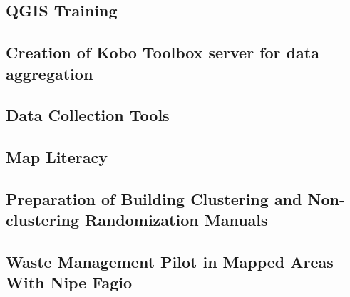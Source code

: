 \documentclass[a4paper,12pt,twoside]{article}
\begin{document}
    \begin{multicols}{2}
    \lipsum[0-5]
    \end{multicols}

\subsection{QGIS Training}

    \begin{multicols}{2}
    \lipsum[0-5]
    \end{multicols}

\subsection{Creation of Kobo Toolbox  server for data aggregation}

    \begin{multicols}{2}
    \lipsum[0-5]
    \end{multicols}
	
\subsection{Data Collection Tools}

    \begin{multicols}{2}
    \lipsum[0-5]
    \end{multicols}

\subsection{Map Literacy}

    \begin{multicols}{2}
    \lipsum[0-5]
    \end{multicols}

\subsection{Preparation of Building Clustering and Non-clustering Randomization Manuals}

    \begin{multicols}{2}
    \lipsum[0-5]
    \end{multicols}

\subsection{Waste Management Pilot in Mapped Areas With Nipe Fagio}
\end{document}
